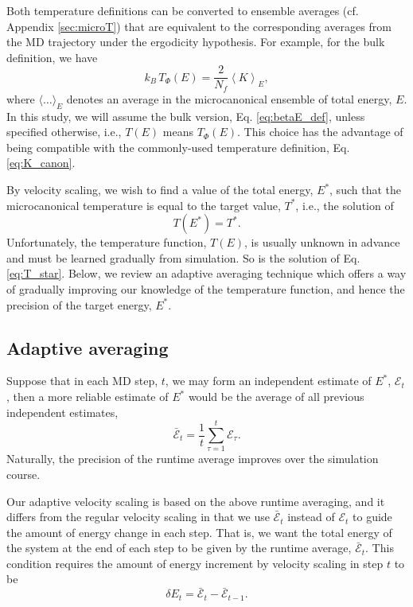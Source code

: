 \documentclass[reprint]{revtex4-1}
\begin{document}
Both temperature definitions can be converted to
ensemble averages (cf. Appendix \ref{sec:microT})
that are equivalent to
the corresponding averages from the MD trajectory
under the ergodicity hypothesis.
%
For example, for the bulk definition, we have
%
\begin{equation}
  k_B \, T_\Phi(E)
  =
  \frac{ 2 } { N_f }
  \left\langle
    K
  \right\rangle_E
  ,
  \label{eq:TE_K}
\end{equation}
%
where $\langle \dots \rangle_E$ denotes
an average in the microcanonical ensemble of total energy, $E$.
%
In this study,
we will assume the bulk version, Eq. \eqref{eq:betaE_def},
unless specified otherwise,
i.e., $T(E)$ means $T_\Phi(E)$.
%
This choice has the advantage of being compatible
with the commonly-used temperature definition, Eq. \eqref{eq:K_canon}.
%


By velocity scaling, we wish to
find a value of the total energy, $E^*$,
such that the microcanonical temperature
is equal to the target value, $T^*$,
i.e., the solution of
%
\begin{equation}
  T(E^*)
  =
  T^*
  .
  \label{eq:T_star}
\end{equation}
%
Unfortunately, the temperature function, $T(E)$,
is usually unknown in advance
and must be learned gradually from simulation.
%
So is the solution of Eq. \eqref{eq:T_star}.
%
Below, we review an adaptive averaging technique
which offers a way of gradually improving
our knowledge of the temperature function,
and hence the precision of the target energy, $E^*$.



\subsection{Adaptive averaging}



Suppose that in each MD step, $t$,
we may form an independent estimate of $E^*$,
$\mathcal E_t$,
then a more reliable estimate of $E^*$
would be the average of
all previous independent estimates,
%
\begin{equation}
  \bar{\mathcal E}_t
  =
  \frac 1 t
  \sum_{\tau = 1}^t
    \mathcal E_\tau
  .
  \label{eq:Epsave}
\end{equation}
%
Naturally, the precision of the runtime average
improves over the simulation course.



Our adaptive velocity scaling is based on
the above runtime averaging,
and it differs from the regular velocity scaling
in that we use $\bar{\mathcal E}_t$
instead of $\mathcal E_t$
to guide the amount of energy change in each step.
%
That is, we want
the total energy of the system
at the end of each step
to be given by
the runtime average, $\bar{\mathcal E}_t$.
%
This condition requires the amount of energy increment
by velocity scaling in step $t$ to be
%
\begin{equation}
  \delta E_t
  =
  \bar{\mathcal E}_t - \bar{\mathcal E}_{t - 1}
  .
  \label{eq:dE_adaptive}
\end{equation}
\end{document}
